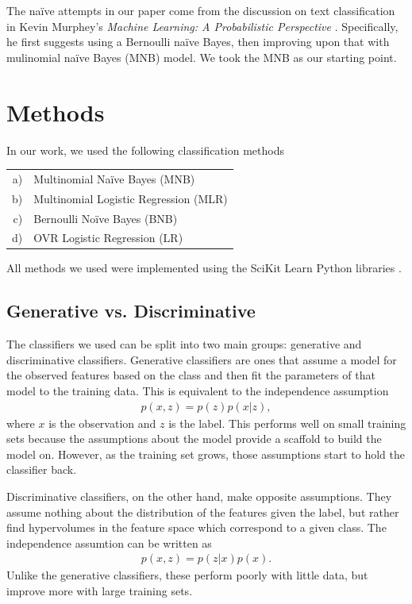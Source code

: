 \documentclass{article} %
\begin{document}
	The na\"ive attempts in our paper come from the discussion on text classification in Kevin Murphey's \emph{Machine Learning: A Probabilistic Perspective} \cite{Murphy2012}. Specifically, he first suggests using a Bernoulli na\"ive Bayes, then improving upon that with mulinomial na\"ive Bayes (MNB) model. We took the MNB as our starting point. 
	
	
	\section{Methods}
	
	In our work, we used the following classification methods
	
	\begin{tabular}{rl}
		a) & Multinomial Na\"ive Bayes (MNB)\\
		b) & Multinomial Logistic Regression (MLR)\\
		c) & Bernoulli No\"ive Bayes (BNB) \\
		d) & OVR Logistic Regression (LR)
	\end{tabular}

	All methods we used were implemented using the SciKit Learn Python libraries \cite{scikit-learn}. 
	
	\subsection{Generative vs. Discriminative}
	
	The classifiers we used can be split into two main groups: generative and discriminative classifiers. Generative classifiers are ones that assume a model for the observed features based on the class and then fit the parameters of that model to the training data. This is equivalent to the independence assumption
	\begin{align}
	p(x,z) = p(z)p(x|z),
	\end{align}
	where $x$ is the observation and $z$ is the label. This performs well on small training sets because the assumptions about the model provide a scaffold to build the model on. However, as the training set grows, those assumptions start to hold the classifier back.
	
	Discriminative classifiers, on the other hand, make opposite assumptions. They assume nothing about the distribution of the features given the label, but rather find hypervolumes in the feature space which correspond to a given class. The independence assumtion can be written as 
	\begin{align}
	p(x,z) = p(z|x)p(x).
	\end{align}
	Unlike the generative classifiers, these perform poorly with little data, but improve more with large training sets. 
	
\end{document}
